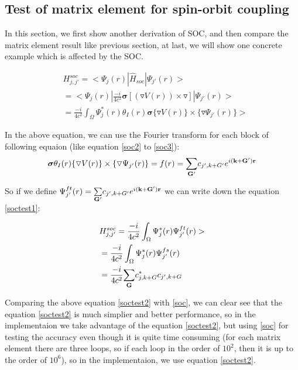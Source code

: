 \documentclass[a4paper]{report}
\begin{document}
\subsection{Test of matrix element for spin-orbit coupling}

In this section, we first show another derivation of SOC, and then compare the matrix element result like previous section, at last, we will show one concrete example which 
is affected by the SOC.

\begin{equation}\label{soctest1}
\begin{split}
 & H_{j,j'}^{soc} = < \Psi_j(r) | \widehat{H}_{soc}  | \Psi_{j'}(r) >  \\
& =   < \Psi_j(r)  |  \frac{-i}{4 c^2} \boldsymbol{\sigma} [ (\triangledown V(r)) \times \triangledown] |  \Psi_{j'}(r)  > \\
& =  \frac{-i}{4 c^2}   \int_{\Omega} \Psi^{*}_j(r)  \theta_{I}(r)  \boldsymbol{\sigma}  \{ \triangledown V(r) \} \times \{ \triangledown \Psi_{j'}(r) \}  > 
\end{split}
\end{equation}

In the above equation, we can use the Fourier transform for each block of following equaion (like equation \ref{soc2} to \ref{soc3}):
\begin{equation}
  \boldsymbol{\sigma} \theta_{I}(r) \{ \triangledown V(r) \} \times \{ \triangledown \Psi_{j'}(r) \} = f(r) = \sumg<G'> c_{j',k+G'} \expg<(k+G')>
\end{equation}

So if we define $\Psi^{ft}_{j'}(r) = \sumg<G'> c_{j',k+G'} \expg<(k+G')>$ we can write down the equation \ref{soctest1}:

\begin{equation}\label{soctest2}
\begin{split}
& H_{j,j'}^{soc} =   \frac{-i}{4 c^2}   \int_{\Omega} \Psi^{*}_j(r)     \Psi^{ft}_{j'}(r)  >  \\
& = \frac{-i}{4 c^2}   \int_{\Omega} \Psi^{*}_j(r)  \Psi^{fs}_{j'}(r)  \\
& = \frac{-i}{4 c^2}   \sumg<G> c^{*}_{j,k+G} c_{j',k+G} 
\end{split}
\end{equation}

Comparing the above equation \ref{soctest2} with \ref{soc}, we can clear see that the equation \ref{soctest2} is much simplier and better performance, so in the implementaion
we take advantage of the equation \ref{soctest2}, but using \ref{soc} for testing the accuracy even though it is quite time consuming (for each matrix element there are three loops, 
so if each loop in the order of $10^2$, then it is up to the order of $10^{6}$),  so in the implementaion, we use equation \ref{soctest2}.
\end{document}
